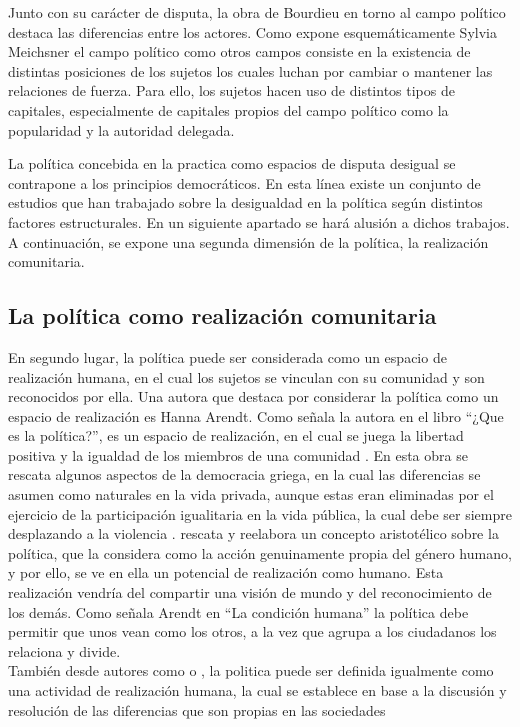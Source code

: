 \documentclass[12pt,twoside]{templates/facsothesis}
\begin{document}
Junto con su carácter de disputa, la obra de Bourdieu en torno al campo político destaca las diferencias entre los actores. Como expone esquemáticamente Sylvia Meichsner el campo político como otros campos consiste en la existencia de distintas posiciones de los sujetos los cuales luchan por cambiar o mantener las relaciones de fuerza. Para ello, los sujetos hacen uso de distintos tipos de capitales, especialmente de capitales propios del campo político como la popularidad y la autoridad delegada.

La política concebida en la practica como espacios de disputa desigual se contrapone a los principios democráticos. En esta línea existe un conjunto de estudios que han trabajado sobre la desigualdad en la política según distintos factores estructurales. En un siguiente apartado se hará alusión a dichos trabajos. A continuación, se expone una segunda dimensión de la política, la realización comunitaria.

\hypertarget{la-poluxedtica-como-realizaciuxf3n-comunitaria}{%
\subsection{La política como realización comunitaria}\label{la-poluxedtica-como-realizaciuxf3n-comunitaria}}

En segundo lugar, la política puede ser considerada como un espacio de realización humana, en el cual los sujetos se vinculan con su comunidad y son reconocidos por ella. Una autora que destaca por considerar la política como un espacio de realización es Hanna Arendt. Como señala la autora en el libro ``¿Que es la política?'', es un espacio de realización, en el cual se juega la libertad positiva y la igualdad de los miembros de una comunidad \citep{arendt_Que_2009}. En esta obra se rescata algunos aspectos de la democracia griega, en la cual las diferencias se asumen como naturales en la vida privada, aunque estas eran eliminadas por el ejercicio de la participación igualitaria en la vida pública, la cual debe ser siempre desplazando a la violencia \citep{goveacabrera_Vision_2010}. \citet{arendt_Que_2009} rescata y reelabora un concepto aristotélico sobre la política, que la considera como la acción genuinamente propia del género humano, y por ello, se ve en ella un potencial de realización como humano. Esta realización vendría del compartir una visión de mundo y del reconocimiento de los demás. Como señala Arendt en ``La condición humana'' la política debe permitir que unos vean como los otros, a la vez que agrupa a los ciudadanos los relaciona y divide.\\
También desde autores como \citet{lechner_conflictiva_1984} o \citet{mouffe_retorno_1999}, la politica puede ser definida igualmente como una actividad de realización humana, la cual se establece en base a la discusión y resolución de las diferencias que son propias en las sociedades
\end{document}
